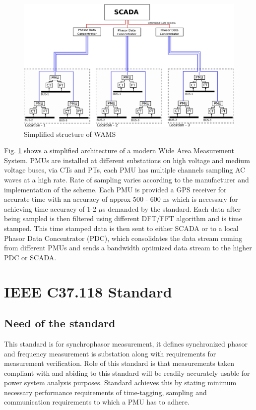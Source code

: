 \begin{figure}
	\includegraphics[width=\textwidth]{fig/wams.eps}
	\caption{Simplified structure of WAMS}
	\label{fig:wams}
\end{figure}

Fig. \ref{fig:wams} shows a simplified architecture of a modern Wide Area Measurement System. PMUs are installed at different substations on high voltage and medium voltage buses, via CTs and PTs, each PMU has multiple channels sampling AC waves at a high rate. Rate of sampling varies according to the manufacturer and implementation of the scheme. Each PMU is provided a GPS receiver for accurate time with an accuracy of approx 500 - 600 ns which is necessary for achieving time accuracy of 1-2 $\mu$s demanded by the standard. Each data after being sampled is then filtered using different DFT/FFT algorithm and is time stamped. This time stamped data is then sent to either SCADA or to a local Phasor Data Concentrator (PDC), which consolidates the data stream coming from different PMUs and sends a bandwidth optimized data stream to the higher PDC or SCADA. 

\section{IEEE C37.118 Standard}

\subsection{Need of the standard}
This standard is for synchrophasor measurement, it defines synchronized phasor and frequency measurement is substation along with requirements for measurement verification. Role of this standard is that measurements taken compliant with and abiding to this standard will be readily accurately usable for power system analysis purposes. Standard achieves this by stating minimum necessary performance requirements of time-tagging, sampling and communication requirements to which a PMU has to adhere.

